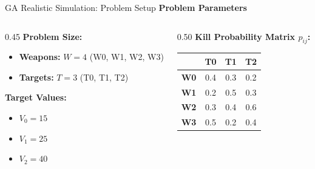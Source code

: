 \documentclass[aspectratio=169,10pt]{beamer}
\begin{document}

\begin{frame}{GA Realistic Simulation: Problem Setup}
  \colorbox{navymid}{\color{white}\bfseries\large Problem Parameters}
  
  \vspace{0.3cm}
  \begin{columns}[T]
    \begin{column}{0.45\textwidth}
      \textbf{Problem Size:}
      \begin{itemize}
        \item \textbf{Weapons:} $W = 4$ (W0, W1, W2, W3)
        \item \textbf{Targets:} $T = 3$ (T0, T1, T2)
      \end{itemize}
      
      \vspace{0.3cm}
      \textbf{Target Values:}
      \begin{itemize}
        \item $V_0 = 15$
        \item $V_1 = 25$
        \item $V_2 = 40$
      \end{itemize}
    \end{column}
    
    \begin{column}{0.50\textwidth}
      \textbf{Kill Probability Matrix $p_{ij}$:}
      
      \vspace{0.2cm}
      \begin{tabular}{c|ccc}
        \toprule
        & \textbf{T0} & \textbf{T1} & \textbf{T2} \\
        \midrule
        \textbf{W0} & 0.4 & 0.3 & 0.2 \\
        \textbf{W1} & 0.2 & 0.5 & 0.3 \\
        \textbf{W2} & 0.3 & 0.4 & 0.6 \\
        \textbf{W3} & 0.5 & 0.2 & 0.4 \\
        \bottomrule
      \end{tabular}
      

\end{column}
\end{columns}
\end{frame}
\end{document}
